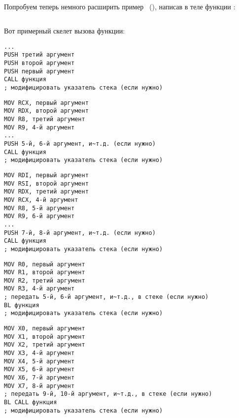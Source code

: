 \chapter{\PrintfSeveralArgumentsSectionName}

Попробуем теперь немного расширить пример \IT{\HelloWorldSectionName}~(),
написав в теле функции \main:







\section{\Conclusion{}}

Вот примерный скелет вызова функции:

\begin{lstlisting}[caption=x86]
...
PUSH третий аргумент
PUSH второй аргумент
PUSH первый аргумент
CALL функция
; модифицировать указатель стека (если нужно)
\end{lstlisting}

\begin{lstlisting}[caption=x64 (MSVC)]
MOV RCX, первый аргумент
MOV RDX, второй аргумент
MOV R8, третий аргумент
MOV R9, 4-й аргумент
...
PUSH 5-й, 6-й аргумент, и~т.д. (если нужно)
CALL функция
; модифицировать указатель стека (если нужно)
\end{lstlisting}

\begin{lstlisting}[caption=x64 (GCC)]
MOV RDI, первый аргумент
MOV RSI, второй аргумент
MOV RDX, третий аргумент
MOV RCX, 4-й аргумент
MOV R8, 5-й аргумент
MOV R9, 6-й аргумент
...
PUSH 7-й, 8-й аргумент, и~т.д. (если нужно)
CALL функция
; модифицировать указатель стека (если нужно)
\end{lstlisting}

\begin{lstlisting}[caption=ARM]
MOV R0, первый аргумент
MOV R1, второй аргумент
MOV R2, третий аргумент
MOV R3, 4-й аргумент
; передать 5-й, 6-й аргумент, и~т.д., в стеке (если нужно)
BL функция
; модифицировать указатель стека (если нужно)
\end{lstlisting}

\begin{lstlisting}[caption=ARM64]
MOV X0, первый аргумент
MOV X1, второй аргумент
MOV X2, третий аргумент
MOV X3, 4-й аргумент
MOV X4, 5-й аргумент
MOV X5, 6-й аргумент
MOV X6, 7-й аргумент
MOV X7, 8-й аргумент
; передать 9-й, 10-й аргумент, и~т.д., в стеке (если нужно)
BL CALL функция
; модифицировать указатель стека (если нужно)
\end{lstlisting}

